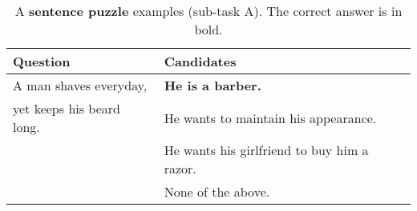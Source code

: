 \begin{table}
	\caption{A \textbf{sentence puzzle} examples (sub-task A). The correct answer is in bold.}
	\label{tab:sentence-puzzle-q}
	\begin{center}
		\begin{tabular}{p{3.5cm}|p{3.5cm}}
			\toprule
			Question                  & Candidates                                  \\
			\midrule
			A man shaves everyday,    & \textbf{He is a barber.}                    \\
			yet keeps his beard long. & He wants to maintain his appearance.        \\
			                          & He wants his girlfriend to buy him a razor. \\
			                          & None of the above.                          \\
			\bottomrule
		\end{tabular}
	\end{center}
\end{table}

